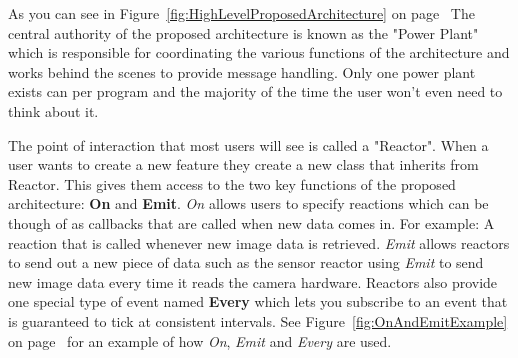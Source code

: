 \documentclass[english,12pt]{scrartcl}
\begin{document}
			As you can see in Figure~\ref{fig:HighLevelProposedArchitecture} on
			page~\pageref{fig:HighLevelProposedArchitecture}
			The central authority of the proposed architecture is known as the "Power Plant" which
			is responsible for coordinating the various functions of the architecture and works
			behind the scenes to provide message handling. Only one power plant exists can per
			program and the majority of the time the user won't even need to think about it.

			The point of interaction that most users will see is called a "Reactor". When a user
			wants to create a new feature they create a new class that inherits from Reactor. This
			gives them access to the two key functions of the proposed architecture: \textbf{On} and
			\textbf{Emit}. \emph{On} allows users to specify reactions which can be though of as
			callbacks that are called when new data comes in. For example: A reaction that is called
			whenever new image data is retrieved. \emph{Emit} allows reactors to send out a new
			piece of data such as the sensor reactor using \emph{Emit} to send new image data every
			time it reads the camera hardware. Reactors also provide one special type of event named
			\textbf{Every} which lets you subscribe to an event that is guaranteed to tick at
			consistent intervals. See Figure~\ref{fig:OnAndEmitExample} on
			page~\pageref{fig:OnAndEmitExample} for an example of how \emph{On}, \emph{Emit} and
			\emph{Every} are used.
\end{document}
